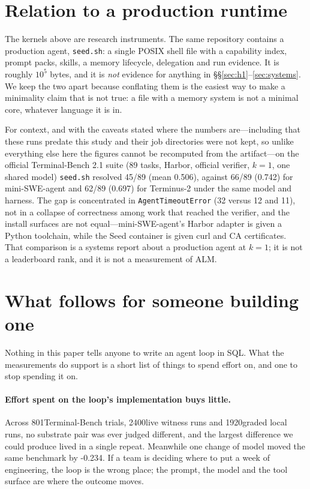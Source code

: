\documentclass[11pt,a4paper]{article}
\begin{document}
\section{Relation to a production runtime}
\label{sec:seed}

The kernels above are research instruments. The same repository contains a
production agent, \texttt{seed.sh}: a single POSIX shell file with a capability
index, prompt packs, skills, a memory lifecycle, delegation and run evidence.
It is roughly $10^5$ bytes, and it is \emph{not} evidence for anything in
\S\S\ref{sec:h1}--\ref{sec:systems}. We keep the two apart because conflating
them is the easiest way to make a minimality claim that is not true: a file
with a memory system is not a minimal core, whatever language it is in.

For context, and with the caveats stated where the numbers are---including
that these runs predate this study and their job directories were not
kept, so unlike everything else here the figures cannot be recomputed from
the artifact---on the official
Terminal-Bench 2.1 suite (89 tasks, Harbor, official verifier, $k{=}1$, one
shared model) \texttt{seed.sh} resolved 45/89 (mean 0.506), against 66/89
(0.742) for mini-SWE-agent and 62/89 (0.697) for Terminus-2 under the same
model and harness. The gap is concentrated in \texttt{AgentTimeoutError}
(32 versus 12 and 11), not in a collapse of correctness among work that reached
the verifier, and the install surfaces are not equal---mini-SWE-agent's Harbor
adapter is given a Python toolchain, while the Seed container is given curl and
CA certificates. That comparison is a systems report about a production agent
at $k{=}1$; it is not a leaderboard rank, and it is not a measurement of ALM.

\section{What follows for someone building one}
\label{sec:implications}

Nothing in this paper tells anyone to write an agent loop in SQL. What the
measurements do support is a short list of things to spend effort on, and one
to stop spending it on.

\paragraph{Effort spent on the loop's implementation buys little.}
Across 801Terminal-Bench trials, 2400live witness runs and
1920graded local runs, no substrate pair was ever judged different, and
the largest difference we could produce lived in a single repeat. Meanwhile one
change of model moved the same benchmark by -0.234. If a team is deciding
where to put a week of engineering, the loop is the wrong place; the prompt,
the model and the tool surface are where the outcome moves.
\end{document}
